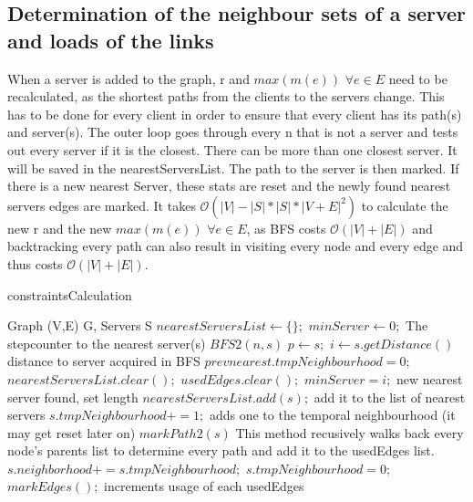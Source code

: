\documentclass [12pt]{article}
\begin{document}
\subsection{Determination of the neighbour sets of a server and loads of the links}
When a server is added to the graph, r and $max(m(e))$ $\forall e\in E $ need to be recalculated, as the shortest paths from the clients
to the servers change. This has to be done for every client in order to ensure that every client has its path(s) and server(s).
The outer loop goes through every n that is not a server and tests out every server if it is the closest. There can be more than one 
closest server. It will be saved in the nearestServersList. The path to the server is then marked. If there is a new nearest Server, these
stats are reset and the newly found nearest servers edges are marked.
It takes $\mathcal O(|V|-|S| * |S| * |V+E|^2 ) $ to calculate the new r and the new $max(m(e))$ $\forall e\in E$, as BFS costs $ \mathcal O(|V| + |E|) $
and backtracking every path can also result in visiting every node and every edge and thus costs $\mathcal O(|V| + |E|)$.
\begin{algorithm}[H]
  \caption{constraintsCalculation}
  \begin{algorithmic}[2]
    \Require Graph (V,E) G, Servers S
    \State $nearestServersList \gets \{\};$ 
    \State $minServer \gets 0;$ \Comment The stepcounter to the nearest server(s)
    \State $BFS2(n,s)$
    \State $p \gets s;$
    \State $i \gets s.getDistance() $ \Comment distance to server acquired in BFS 
    \State $prevnearest.tmpNeighbourhood=0;$
    \State $nearestServersList.clear();$
    \State $usedEdges.clear();$
    \EndFor
    \EndIf
    \State $minServer = i;$ \Comment new nearest server found, set length
    \State $nearestServersList.add(s);$ \Comment add it to the list of nearest servers 
    \State $s.tmpNeighbourhood += 1;$ \Comment adds one to the temporal neighbourhood (it may get reset later on)
    \State $markPath2(s)$ \Comment This method recusively walks back every node's parents list to determine every path and add it to the usedEdges list.
    \EndIf 
    \EndFor
    \State $s.neighborhood += s.tmpNeighbourhood;$
    \State $s.tmpNeighbourhood = 0;$
    \EndFor
    \State $markEdges();$ \Comment increments usage of each usedEdges
    \EndIf
    \EndFor
  \end{algorithmic}
\end{algorithm}
\end{document}
